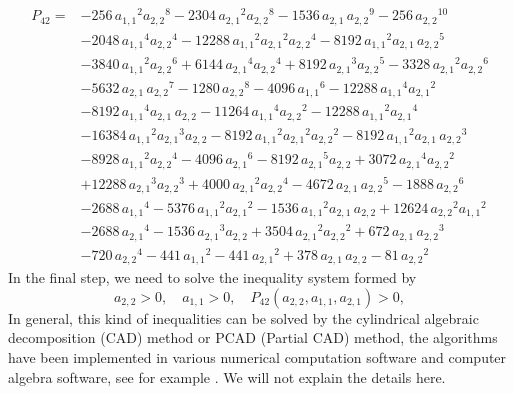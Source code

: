 \documentclass[runningheads]{llncs}
\begin{document}
\begin{align*}
P_{42}=&-256\,{{ a_{1,1}}}^{2}{{ a_{2,2}}}^{8}-2304\,{{ a_{2,1}}}^{2}{{ a_{2,2}}}^
{8}-1536\,{ a_{2,1}}\,{{ a_{2,2}}}^{9}-256\,{{ a_{2,2}}}^{10}\\
&-2048\,{{
 a_{1,1}}}^{4}{{ a_{2,2}}}^{4}-12288\,{{ a_{1,1}}}^{2}{{ a_{2,1}}}^{2}{{
 a_{2,2}}}^{4}-8192\,{{ a_{1,1}}}^{2}{ a_{2,1}}\,{{ a_{2,2}}}^{5}\\
&-3840\,{{
 a_{1,1}}}^{2}{{ a_{2,2}}}^{6}+6144\,{{ a_{2,1}}}^{4}{{ a_{2,2}}}^{4}+8192\,{{ a_{2,1}}}^{3}{{ a_{2,2}}}^{5}-3328\,{{ a_{2,1}}}^{2}{{ a_{2,2}}}^{6}\\
&-5632\,{ a_{2,1}}\,{{ a_{2,2}}}^{7}-1280\,{{ a_{2,2}}}^{8}-4096\,{{ a_{1,1}
}}^{6}-12288\,{{ a_{1,1}}}^{4}{{ a_{2,1}}}^{2}\\
&-8192\,{{ a_{1,1}}}^{4}{
 a_{2,1}}\,{ a_{2,2}}-11264\,{{ a_{1,1}}}^{4}{{ a_{2,2}}}^{2}-12288\,{{
 a_{1,1}}}^{2}{{ a_{2,1}}}^{4}\\
&-16384\,{{ a_{1,1}}}^{2}{{ a_{2,1}}}^{3}{
 a_{2,2}}-8192\,{{ a_{1,1}}}^{2}{{ a_{2,1}}}^{2}{{ a_{2,2}}}^{2}-8192\,{{
 a_{1,1}}}^{2}{ a_{2,1}}\,{{ a_{2,2}}}^{3}\\
&-8928\,{{ a_{1,1}}}^{2}{{ a_{2,2}
}}^{4}-4096\,{{ a_{2,1}}}^{6}-8192\,{{ a_{2,1}}}^{5}{ a_{2,2}}+3072\,{{
 a_{2,1}}}^{4}{{ a_{2,2}}}^{2}\\
&+12288\,{{ a_{2,1}}}^{3}{{ a_{2,2}}}^{3}+
4000\,{{ a_{2,1}}}^{2}{{ a_{2,2}}}^{4}-4672\,{ a_{2,1}}\,{{ a_{2,2}}}^{5}-
1888\,{{ a_{2,2}}}^{6}\\
&-2688\,{{ a_{1,1}}}^{4}-5376\,{{ a_{1,1}}}^{2}{{
 a_{2,1}}}^{2}-1536\,{{ a_{1,1}}}^{2}{ a_{2,1}}\,{ a_{2,2}}+12624\,{{ a_{2,2}}}^{2}{{ a_{1,1}}}^{2}\\
&-2688\,{{ a_{2,1}}}^{4}-1536\,{{ a_{2,1}}}^{3}{
 a_{2,2}}+3504\,{{ a_{2,1}}}^{2}{{ a_{2,2}}}^{2}+672\,{ a_{2,1}}\,{{ a_{2,2}}}^{3}\\
&-720\,{{ a_{2,2}}}^{4}-441\,{{ a_{1,1}}}^{2}-441\,{{ a_{2,1}}}^{
2}+378\,{ a_{2,1}}\,{ a_{2,2}}-81\,{{ a_{2,2}}}^{2}
\end{align*}
In the final step, we need to solve the 
inequality system formed by 
\begin{equation}
a_{2,2}>0,\quad a_{1,1}>0, \quad P_{42}(a_{2,2},a_{1,1},a_{2,1})>0,
\label{semi-algebraic-system-42}
\end{equation}
In general, this kind of inequalities can be solved by the cylindrical algebraic decomposition (CAD) method or PCAD (Partial CAD) method, the algorithms have been implemented in various numerical computation software and computer algebra software, see for example \cite{Gathen2003,Grigoriev1988,Khachiyan1997,lihongzhi2010,xia2016}. We will not explain the details here. 
\end{document}
